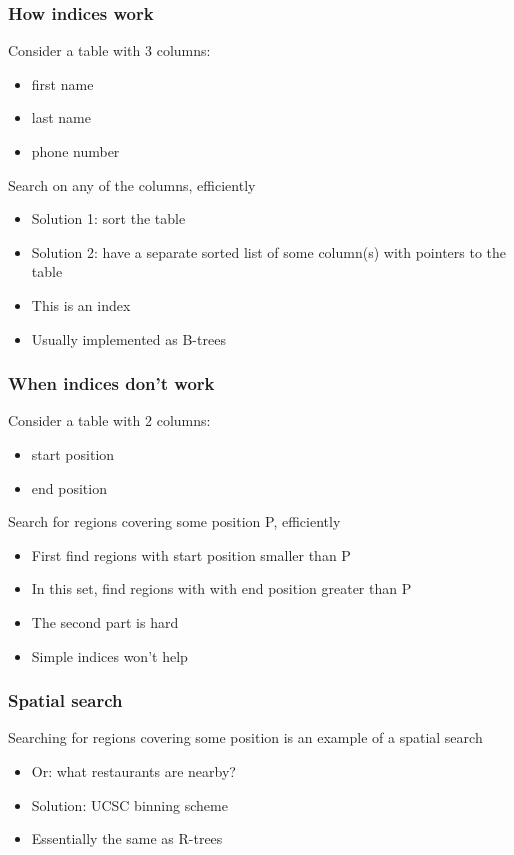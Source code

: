 \documentclass[slidestop]{beamer}
\begin{document}
\begin{frame}
  \frametitle{How indices work}
  Consider a table with 3 columns:
  \begin{itemize}
    \item first name
    \item last name
    \item phone number
  \end{itemize}
  \vspace{0.5cm}
  \pause
  Search on any of the columns, efficiently
  \pause
  \begin{itemize}[<+->]
    \item Solution 1: sort the table
    \item Solution 2: have a separate sorted list of some column(s) with pointers to the table
    \item This is an index
    \item Usually implemented as B-trees
  \end{itemize}
\end{frame}

\begin{frame}
  \frametitle{When indices don't work}
  Consider a table with 2 columns:
  \begin{itemize}
    \item start position
    \item end position
  \end{itemize}
  \vspace{0.5cm}
  \pause
  Search for regions covering some position P, efficiently
  \pause
  \begin{itemize}[<+->]
    \item First find regions with start position smaller than P
    \item In this set, find regions with with end position greater than P
    \item The second part is hard
    \item Simple indices won't help
  \end{itemize}
\end{frame}

\begin{frame}
  \frametitle{Spatial search}
  Searching for regions covering some position is an example of a spatial search
  \begin{itemize}[<+->]
    \item Or: what restaurants are nearby?
    \item Solution: UCSC binning scheme
    \item Essentially the same as R-trees
  \end{itemize}
\end{frame}
\end{document}
